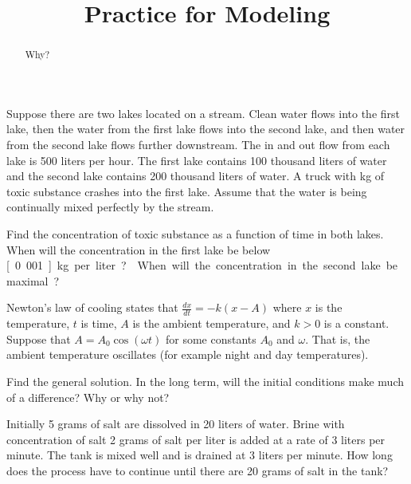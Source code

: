 \documentclass{ximera}
\title{Practice for Modeling}
\begin{document}
\begin{abstract}
    Why?
\end{abstract}
\maketitle

\begin{exercise}
    Suppose there are two lakes located on a stream.  Clean water flows into the first lake, then the water from the first lake flows into the second lake, and then water from the second lake flows further downstream. The in and out flow from each lake is 500 liters per hour. The first lake contains 100 thousand liters of water and the second lake contains 200 thousand liters of water. A truck with \unit[500]{kg} of toxic substance crashes into the first lake.  Assume that the water is being continually mixed perfectly by the stream.
    \begin{tasks}
        \task Find the concentration of toxic substance as a function of time in both lakes.
        \task When will the concentration in the first lake be below \unit[0.001]{kg} per liter?
        \task When will the concentration in the second lake be maximal?
    \end{tasks}
\end{exercise}

\begin{exercise}
    Newton's law of cooling states that $\frac{dx}{dt} = -k(x-A)$ where $x$ is the temperature, $t$ is time, $A$ is the ambient temperature, and $k > 0$ is a constant. Suppose that $A = A_0 \cos (\omega t)$ for some constants $A_0$ and $\omega$. That is, the ambient temperature oscillates (for example night and day temperatures).
    \begin{tasks}
        \task Find the general solution.
        \task In the long term, will the initial conditions make much of a difference?  Why or why not?
    \end{tasks}
\end{exercise}

\begin{exercise}
    Initially 5 grams of salt are dissolved in 20 liters of water.  Brine with concentration of salt 2 grams of salt per liter is added at a rate of 3 liters per minute.  The tank is mixed well and is drained at 3 liters per minute.  How long does the process have to continue until there are 20 grams of salt in the tank?
\end{exercise}
\end{document}
